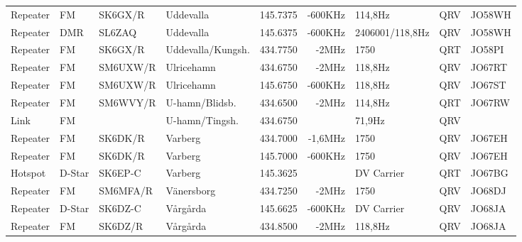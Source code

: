 \begin{landscape}
\begin{longtable}{llllrrlcl}
	Repeater          & FM           & SK6GX/R       & Uddevalla           &          145.7375 &        -600KHz & 114,8Hz         &       QRV       & JO58WH           \\
	Repeater          & DMR          & SL6ZAQ        & Uddevalla           &          145.6375 &        -600KHz & 2406001/118,8Hz &       QRV       & JO58WH           \\
	Repeater          & FM           & SK6GX/R       & Uddevalla/Kungsh.   &          434.7750 &          -2MHz & 1750            &       QRT       & JO58PI           \\
	Repeater          & FM           & SM6UXW/R      & Ulricehamn          &          434.6750 &          -2MHz & 118,8Hz         &       QRV       & JO67RT           \\
	Repeater          & FM           & SM6UXW/R      & Ulricehamn          &          145.6750 &        -600KHz & 118,8Hz         &       QRV       & JO67ST           \\
	Repeater          & FM           & SM6WVY/R      & U-hamn/Blidsb.      &          434.6500 &          -2MHz & 114,8Hz         &       QRT       & JO67RW           \\
	Link              & FM           &               & U-hamn/Tingsh.      &          434.6750 &                & 71,9Hz          &       QRV       &  \\
	Repeater          & FM           & SK6DK/R       & Varberg             &          434.7000 &        -1,6MHz & 1750            &       QRV       & JO67EH           \\
	Repeater          & FM           & SK6DK/R       & Varberg             &          145.7000 &        -600KHz & 1750            &       QRV       & JO67EH           \\
	Hotspot           & D-Star       & SK6EP-C       & Varberg             &          145.3625 &                & DV Carrier      &       QRT       & JO67BG           \\
	Repeater          & FM           & SM6MFA/R      & Vänersborg          &          434.7250 &          -2MHz & 1750            &       QRV       & JO68DJ           \\
	Repeater          & D-Star       & SK6DZ-C       & Vårgårda            &          145.6625 &        -600KHz & DV Carrier      &       QRV       & JO68JA           \\
	Repeater          & FM           & SK6DZ/R       & Vårgårda            &          434.8500 &          -2MHz & 118,8Hz         &       QRV       & JO68JA
\end{longtable}
\normalsize

\end{landscape}
